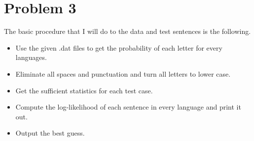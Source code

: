 \documentclass[preprint,12pt]{elsarticle}
\begin{document}
    \section{Problem 3}
    The basic procedure that I will do to the data and test sentences is the following.
    \begin{itemize}
        \item Use the given .dat files to get the probability of each letter for every languages.
        \item Eliminate all spaces and punctuation and turn all letters to lower case.
        \item Get the sufficient statistics for each test case.
        \item Compute the log-likelihood of each sentence in every language and print it out.
        \item Output the best guess.
    \end{itemize}
    
\end{document}
